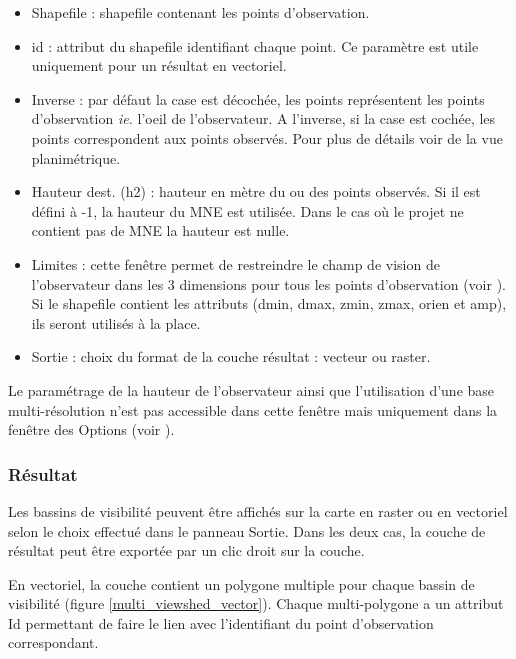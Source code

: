 \documentclass{report}
\begin{document}
\begin{itemize}
	\item Shapefile : shapefile contenant les points d'observation.
	\item id : attribut du shapefile identifiant chaque point. Ce paramètre est utile uniquement pour un résultat en vectoriel.
	\item Inverse : par défaut la case est décochée, les points représentent les points d'observation \textit{ie.} l'oeil de l'observateur. A l'inverse, si la case est cochée, les points correspondent aux points observés. Pour plus de détails voir  de la vue planimétrique.
	\item Hauteur dest. (h2) : hauteur en mètre du ou des points observés. Si il est défini à -1, la hauteur du MNE est utilisée. Dans le cas où le projet ne contient pas de MNE la hauteur est nulle.
	\item Limites : cette fenêtre permet de restreindre le champ de vision de l'observateur dans les 3 dimensions pour tous les points d'observation (voir ). Si le shapefile contient les attributs (dmin, dmax, zmin, zmax, orien et amp), ils seront utilisés à la place.
	\item Sortie : choix du format de la couche résultat : vecteur ou raster.
\end{itemize}

Le paramétrage de la hauteur de l'observateur ainsi que l'utilisation d'une base multi-résolution n'est pas accessible dans cette fenêtre mais uniquement dans la fenêtre des Options (voir ).

\subsubsection{Résultat}
Les bassins de visibilité peuvent être affichés sur la carte en raster ou en vectoriel selon le choix effectué dans le panneau Sortie. Dans les deux cas, la couche de résultat peut être exportée par un clic droit sur la couche.

En vectoriel, la couche contient un polygone multiple pour chaque bassin de visibilité (figure \ref{multi_viewshed_vector}). Chaque multi-polygone a un attribut Id permettant de faire le lien avec l'identifiant du point d'observation correspondant.
\end{document}
